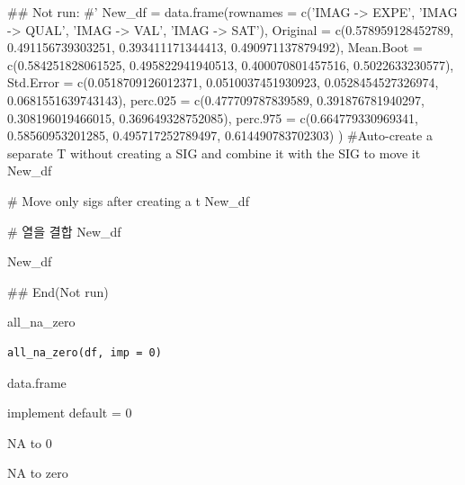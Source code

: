 \documentclass[a4paper]{book}
\begin{document}
%
\begin{Examples}
\begin{ExampleCode}

\#\# Not run: 
#'
New_df = data.frame(rownames = c('IMAG -> EXPE', 'IMAG -> QUAL', 'IMAG -> VAL', 'IMAG -> SAT'),
  Original = c(0.578959128452789, 0.491156739303251, 0.393411171344413, 0.490971137879492),
 Mean.Boot = c(0.584251828061525, 0.495822941940513, 0.400070801457516, 0.5022633230577),
 Std.Error = c(0.0518709126012371, 0.0510037451930923, 0.0528454527326974, 0.0681551639743143),
 perc.025 = c(0.477709787839589, 0.391876781940297, 0.308196019466015, 0.369649328752085),
  perc.975 = c(0.664779330969341, 0.58560953201285, 0.495717252789497, 0.614490783702303)
)
#Auto-create a separate T without creating a SIG and combine it with the SIG to move it
New_df %


# Move only sigs after creating a t
New_df %

# 열을 결합
New_df %

New_df %


## End(Not run)
\end{ExampleCode}
\end{Examples}
%
\begin{Description}
all\_na\_zero
\end{Description}
%
\begin{Usage}
\begin{verbatim}
all_na_zero(df, imp = 0)
\end{verbatim}
\end{Usage}
%
\begin{Arguments}
\begin{ldescription}
\item[\code{df}] data.frame

\item[\code{imp}] implement default = 0
\end{ldescription}
\end{Arguments}
%
\begin{Value}
NA to 0
\end{Value}
%
\begin{Description}
NA to zero
\end{Description}
\end{document}
